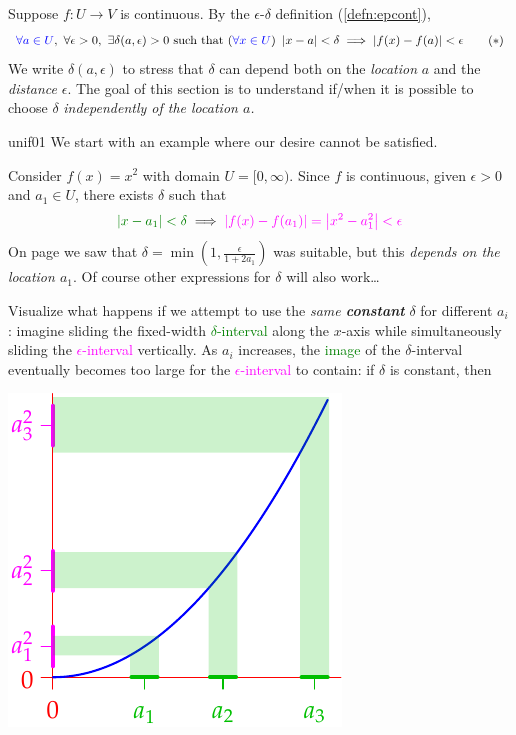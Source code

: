 Suppose $f:U\to V$ is continuous. By the $\epsilon$-$\delta$ definition (\ref{defn:epcont}),
\[
	\textcolor{blue}{\forall a\in U},\ \forall \epsilon>0,\ 
	\exists \delta(a,\epsilon)>0\text{ such that }
	(\textcolor{blue}{\forall x\in U})\ 
	\nm{x-a}<\delta\implies\nm{f(x)-f(a)}<\epsilon
	\tag{$\ast$}
\]
We write $\delta(a,\epsilon)$ to stress that $\delta$ can depend both on the \emph{location} $a$ and the \emph{distance} $\epsilon$. The goal of this section is to understand if/when it is possible to choose $\delta$ \emph{independently of the location $a$.} 

\begin{example}{}{unif01}
	We start with an example where our desire cannot be satisfied.\par
	\begin{minipage}[t]{0.64\linewidth}\vspace{-5pt}
		Consider $f(x)=x^2$ with domain $U=[0,\infty)$. Since $f$ is continuous, given $\epsilon>0$ and $a_1\in U$, there exists
		$\delta$ such that
		\[
			\textcolor{Green}{\nm{x-a_1}<\delta}\implies \textcolor{Magenta}{\nm{f(x)-f(a_1)}=\nm{x^2-a_1^2}<\epsilon}
		\]
		On page \pageref{thm:cont} we saw that $\delta=\min(1,\frac\epsilon{1+2a_1})$ was suitable, but this \emph{depends on the location $a_1$}. Of course other expressions for $\delta$ will also work\ldots\par
		Visualize what happens if we attempt to use the \emph{same \textbf{constant}} $\delta$ for different $a_i$: imagine sliding the fixed-width \textcolor{Green}{$\delta$-interval} along the $x$-axis while simultaneously sliding the \textcolor{Magenta}{$\epsilon$-interval} vertically. As $a_i$ increases, the \textcolor{Green}{image} of the $\delta$-interval eventually becomes too large for the \textcolor{Magenta}{$\epsilon$-interval} to contain: if $\delta$ is constant, then
	\end{minipage}
	\hfill
	\begin{minipage}[t]{0.34\linewidth}\vspace{0pt}
		\flushright\includegraphics[scale=0.95]{unifcont}

\end{minipage}
\end{example}
